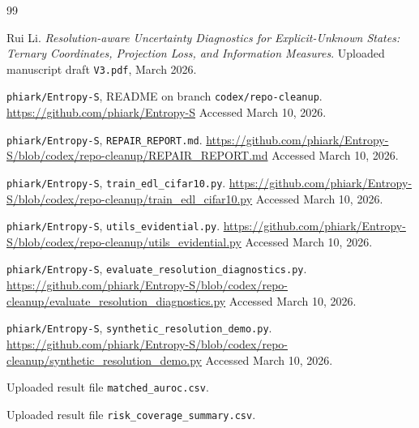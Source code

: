 \documentclass[11pt]{article}
\begin{document}
\begin{thebibliography}{99}

Rui Li.
\newblock \emph{Resolution-aware Uncertainty Diagnostics for Explicit-Unknown States:
Ternary Coordinates, Projection Loss, and Information Measures}.
\newblock Uploaded manuscript draft \texttt{V3.pdf}, March 2026.

\texttt{phiark/Entropy-S}, README on branch \texttt{codex/repo-cleanup}.
\newblock \url{https://github.com/phiark/Entropy-S}
\newblock Accessed March 10, 2026.

\texttt{phiark/Entropy-S}, \texttt{REPAIR\_REPORT.md}.
\newblock \url{https://github.com/phiark/Entropy-S/blob/codex/repo-cleanup/REPAIR_REPORT.md}
\newblock Accessed March 10, 2026.

\texttt{phiark/Entropy-S}, \texttt{train\_edl\_cifar10.py}.
\newblock \url{https://github.com/phiark/Entropy-S/blob/codex/repo-cleanup/train_edl_cifar10.py}
\newblock Accessed March 10, 2026.

\texttt{phiark/Entropy-S}, \texttt{utils\_evidential.py}.
\newblock \url{https://github.com/phiark/Entropy-S/blob/codex/repo-cleanup/utils_evidential.py}
\newblock Accessed March 10, 2026.

\texttt{phiark/Entropy-S}, \texttt{evaluate\_resolution\_diagnostics.py}.
\newblock \url{https://github.com/phiark/Entropy-S/blob/codex/repo-cleanup/evaluate_resolution_diagnostics.py}
\newblock Accessed March 10, 2026.

\texttt{phiark/Entropy-S}, \texttt{synthetic\_resolution\_demo.py}.
\newblock \url{https://github.com/phiark/Entropy-S/blob/codex/repo-cleanup/synthetic_resolution_demo.py}
\newblock Accessed March 10, 2026.

Uploaded result file \texttt{matched\_auroc.csv}.

Uploaded result file \texttt{risk\_coverage\_summary.csv}.

\end{thebibliography}
\end{document}

